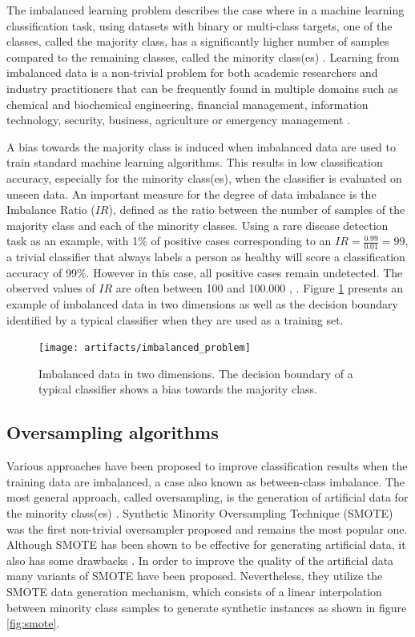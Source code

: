 \documentclass[preprint,12pt, a4paper]{elsarticle}
\begin{document}
The imbalanced learning problem describes the case where in a machine learning
classification task, using datasets with binary or multi-class targets, one of
the classes, called the majority class, has a significantly higher number of
samples compared to the remaining classes, called the minority class(es)
\cite{Chawla2003}. Learning from imbalanced data is a non-trivial problem for
both academic researchers and industry practitioners that can be frequently
found in multiple domains such as chemical and biochemical engineering,
financial management, information technology, security, business, agriculture or
emergency management \cite{Haixiang2017}.

A bias towards the majority class is induced when imbalanced data are used to train standard machine learning algorithms. This results in low classification accuracy, especially for the minority class(es), when the classifier is evaluated on unseen data. An important measure for the degree of data imbalance is the Imbalance Ratio ($IR$), defined as the ratio between the number of samples of the majority class and each of the minority classes. Using a rare disease detection task as an example, with 1\% of positive cases corresponding to an $IR=\frac{0.99}{0.01}=99$, a trivial classifier that always labels a person as healthy will score a classification accuracy of 99\%. However in this case, all positive cases remain undetected. The observed values of $IR$ are often between 100 and 100.000 \cite{Chawla2002}, \cite{Barua2014}. Figure \ref{fig:imbalanced} presents an example of imbalanced data in two dimensions as well as the decision boundary identified by a typical classifier when they are used as a training set.

\begin{figure}[H]
	\centering
	\texttt{[image: artifacts/imbalanced\_problem]}
	\caption{Imbalanced data in two dimensions. The decision boundary of a typical classifier shows a bias towards the majority class.}
	\label{fig:imbalanced}
\end{figure}

\subsection{Oversampling algorithms}
\label{oversampling}

Various approaches have been proposed to improve classification results when the training data are imbalanced, a case also known as between-class imbalance. The most general approach, called oversampling, is the generation of artificial data for the minority class(es) \cite{Fernandez2013}. Synthetic Minority Oversampling Technique (SMOTE) \cite{Chawla2002} was the first non-trivial oversampler proposed and remains the most popular one. Although SMOTE has been shown to be effective for generating artificial data, it also has some drawbacks \cite{He2009}. In order to improve the quality of the artificial data many variants of SMOTE have been proposed. Nevertheless, they utilize the SMOTE data generation mechanism, which consists of a linear interpolation between minority class samples to generate synthetic instances as shown in figure \ref{fig:smote}.
\end{document}
